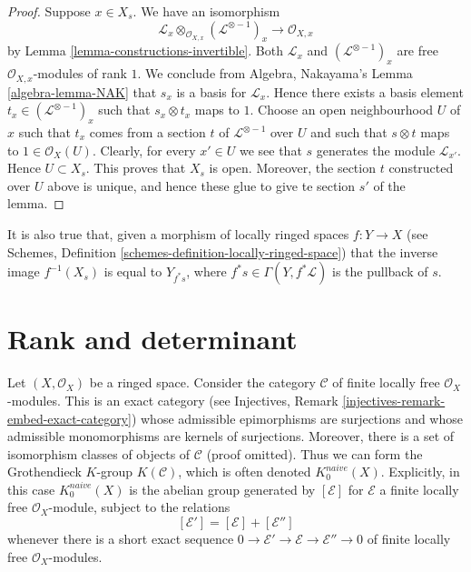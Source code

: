 \begin{proof}
Suppose $x \in X_s$.
We have an isomorphism
$$
\mathcal{L}_x \otimes_{\mathcal{O}_{X, x}} (\mathcal{L}^{\otimes -1})_x
\longrightarrow
\mathcal{O}_{X, x}
$$
by Lemma \ref{lemma-constructions-invertible}.
Both $\mathcal{L}_x$ and $(\mathcal{L}^{\otimes -1})_x$
are free $\mathcal{O}_{X, x}$-modules of rank $1$. We conclude
from Algebra, Nakayama's Lemma \ref{algebra-lemma-NAK} that
$s_x$ is a basis for $\mathcal{L}_x$. Hence there exists
a basis element $t_x \in (\mathcal{L}^{\otimes -1})_x$
such that $s_x \otimes t_x$ maps to $1$.
Choose an open neighbourhood $U$ of
$x$ such that $t_x$ comes from a section $t$
of $\mathcal{L}^{\otimes -1}$ over $U$ and such that
$s \otimes t$ maps to $1 \in \mathcal{O}_X(U)$.
Clearly, for every $x' \in U$ we see that $s$ generates
the module $\mathcal{L}_{x'}$. Hence $U \subset X_s$.
This proves that $X_s$ is open. Moreover, the section
$t$ constructed over $U$ above is unique, and hence
these glue to give te section $s'$ of the lemma.
\end{proof}

\noindent
It is also true that, given a morphism of locally ringed
spaces $f : Y \to X$
(see Schemes, Definition \ref{schemes-definition-locally-ringed-space})
that the inverse image $f^{-1}(X_s)$ is equal to $Y_{f^*s}$, where
$f^*s \in \Gamma(Y, f^*\mathcal{L})$ is the pullback of $s$.



\section{Rank and determinant}
\label{section-rank-and-det}

\noindent
Let $(X, \mathcal{O}_X)$ be a ringed space. Consider the category
$\mathcal{C}$ of finite locally free $\mathcal{O}_X$-modules.
This is an exact category
(see Injectives, Remark \ref{injectives-remark-embed-exact-category})
whose admissible epimorphisms are
surjections and whose admissible monomorphisms are kernels of
surjections. Moreover, there is a set of isomorphism classes
of objects of $\mathcal{C}$ (proof omitted). Thus we can form
the Grothendieck $K$-group $K(\mathcal{C})$, which is often denoted
$K_0^{naive}(X)$. Explicitly, in this case $K_0^{naive}(X)$ is
the abelian group generated by $[\mathcal{E}]$ for $\mathcal{E}$
a finite locally free $\mathcal{O}_X$-module, subject to the relations
$$
[\mathcal{E}'] = [\mathcal{E}] + [\mathcal{E}'']
$$
whenever there is a short exact sequence
$0 \to \mathcal{E}' \to \mathcal{E} \to \mathcal{E}'' \to 0$
of finite locally free $\mathcal{O}_X$-modules.

